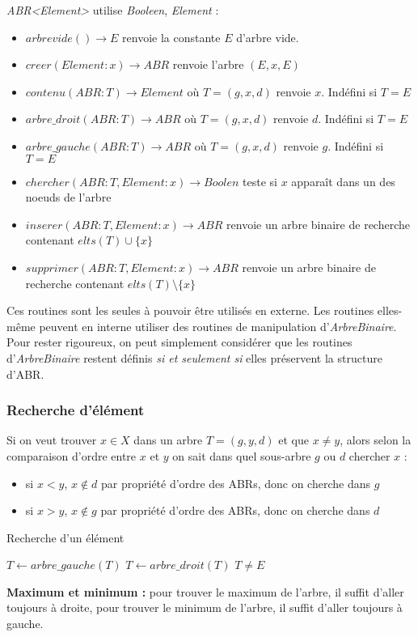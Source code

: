 \documentclass[../../../main.tex]{subfiles}
\begin{document}
\textit{ABR\textless{}Element\textgreater} utilise \textit{Booleen}, \textit{Element} :
\begin{itemize}
	\item $arbrevide()\rightarrow E$ renvoie la constante $E$ d'arbre vide.
	\item $creer(Element:x) \rightarrow ABR$ renvoie l'arbre $(E, x, E)$
	\item $contenu(ABR:T)\rightarrow Element$ où $T = (g, x, d)$ renvoie $x$. Indéfini si $T = E$
	\item $arbre\_droit(ABR:T)\rightarrow ABR$ où $T = (g, x, d)$ renvoie $d$. Indéfini si $T = E$
	\item $arbre\_gauche(ABR:T)\rightarrow ABR$ où $T = (g, x, d)$ renvoie $g$. Indéfini si $T = E$
	\item $chercher(ABR:T, Element:x)\rightarrow Boolen$ teste si $x$ apparaît dans un des noeuds de l'arbre
	\item $inserer(ABR:T, Element:x)\rightarrow ABR$ renvoie un arbre binaire de recherche contenant $elts(T)\cup\{x\}$
	\item $supprimer(ABR:T, Element:x)\rightarrow ABR$ renvoie un arbre binaire de recherche contenant $elts(T)\setminus\{x\}$
\end{itemize}

Ces routines sont les seules à pouvoir être utilisés en externe. Les routines elles-même peuvent en interne utiliser des routines de manipulation d'\textit{ArbreBinaire}. Pour rester rigoureux, on peut simplement considérer que les routines d'\textit{ArbreBinaire} restent définis \textit{si et seulement si} elles préservent la structure d'ABR.
\subsubsection{Recherche d'élément}
Si on veut trouver $x\in X$ dans un arbre $T = (g, y, d)$ et que $x \neq y$, alors selon la comparaison d'ordre entre $x$ et $y$ on sait dans quel sous-arbre $g$ ou $d$ chercher $x$ :
\begin{itemize}
	\item si $x < y$, $x\notin d$ par propriété d'ordre des ABRs, donc on cherche dans $g$
	\item si $x > y$, $x\notin g$ par propriété d'ordre des ABRs, donc on cherche dans $d$
\end{itemize}
\begin{algorithm}
\caption{Recherche d'un élément \label{alg:recherche_abr}}
 {
	 {
		$T\leftarrow arbre\_gauche(T)$\;
	} {
		$T\leftarrow arbre\_droit(T)$\;
	}
}
\Return $T\neq E$
\end{algorithm}
\textbf{Maximum et minimum :} pour trouver le maximum de l'arbre, il suffit d'aller toujours à droite, pour trouver le minimum de l'arbre, il suffit d'aller toujours à gauche.
\end{document}
